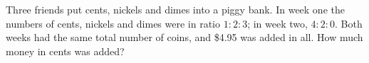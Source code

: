 Three friends put cents, nickels and dimes into a piggy bank. In week one the numbers of cents, nickels and dimes were in ratio $1:2:3$; in week two, $4:2:0$. Both weeks had the same total number of coins, and \$4.95 was added in all. How much money in cents was added?
